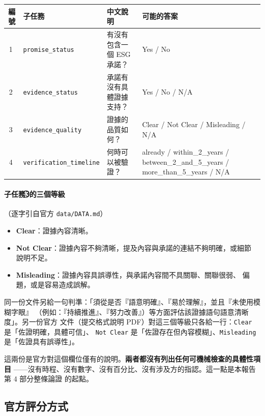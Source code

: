 \documentclass[11pt,a4paper]{ctexart}
\newcommand{\fn}[1]{\texttt{#1}}
\begin{document}
\begin{table}[h]
\centering\small
\begin{tabular}{@{}clp{3.9cm}p{5.4cm}@{}}
\toprule
編號 & 子任務 & 中文說明 & 可能的答案 \\
\midrule
\textcircled{1} & \fn{promise\_status} & 有沒有包含一個 ESG 承諾？ & Yes / No \\
\textcircled{2} & \fn{evidence\_status} & 承諾有沒有具體證據支持？ & Yes / No / N/A \\
\textcircled{3} & \fn{evidence\_quality} & 證據的品質如何？ & Clear / Not Clear / Misleading / N/A \\
\textcircled{4} & \fn{verification\_timeline} & 何時可以被驗證？ & already / within\_2\_years / between\_2\_and\_5\_years / more\_than\_5\_years / N/A \\
\bottomrule
\end{tabular}
\end{table}

\paragraph{子任務\textcircled{3}的三個等級}（逐字引自官方 \texttt{data/DATA.md}）
\begin{itemize}[leftmargin=2em, itemsep=2pt]
  \item \textbf{Clear}：證據內容清晰。
  \item \textbf{Not Clear}：證據內容不夠清晰，提及內容與承諾的連結不夠明確，或細節
        說明不足。
  \item \textbf{Misleading}：證據內容具誤導性，與承諾內容間不具關聯、關聯很弱、
        偏題，或是容易造成誤解。
\end{itemize}

同一份文件另給一句判準：「須從是否『語意明確』、『易於理解』，並且『未使用模糊字眼』
（例如：『持續推進』、『努力改善』）等方面評估該證據語句語意清晰度」。另一份官方
文件（提交格式說明 PDF）對這三個等級只各給一行：\fn{Clear} 是「佐證明確，具體可信」、
\fn{Not Clear} 是「佐證存在但內容模糊」、\fn{Misleading} 是「佐證具有誤導性」。

\begin{tcolorbox}[colback=gray!8, colframe=gray!55]
這兩份是官方對這個欄位僅有的說明。\textbf{兩者都沒有列出任何可機械檢查的具體性項目}
——沒有時程、沒有數字、沒有百分比、沒有涉及方的指認。這一點是本報告第 4 部分整條論證
的起點。
\end{tcolorbox}

\subsection{官方評分方式}
\end{document}
